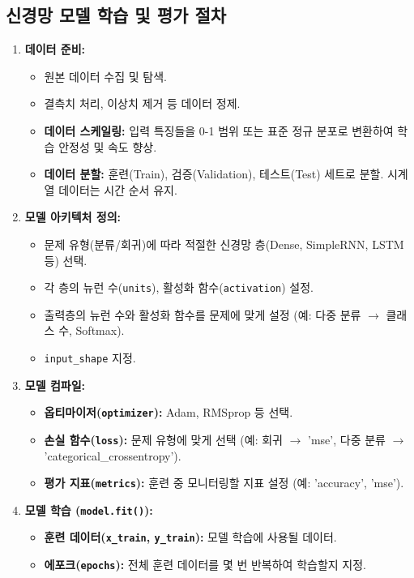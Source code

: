 \documentclass[11pt,a4paper]{article}
\theoremstyle{definition}
\begin{document}
\subsection{신경망 모델 학습 및 평가 절차}
\begin{enumerate}
    \item \textbf{데이터 준비:}
    \begin{itemize}
        \item 원본 데이터 수집 및 탐색.
        \item 결측치 처리, 이상치 제거 등 데이터 정제.
        \item \textbf{데이터 스케일링:} 입력 특징들을 0-1 범위 또는 표준 정규 분포로 변환하여 학습 안정성 및 속도 향상.
        \item \textbf{데이터 분할:} 훈련(Train), 검증(Validation), 테스트(Test) 세트로 분할. 시계열 데이터는 시간 순서 유지.
    \end{itemize}
    \item \textbf{모델 아키텍처 정의:}
    \begin{itemize}
        \item 문제 유형(분류/회귀)에 따라 적절한 신경망 층(Dense, SimpleRNN, LSTM 등) 선택.
        \item 각 층의 뉴런 수(\texttt{units}), 활성화 함수(\texttt{activation}) 설정.
        \item 출력층의 뉴런 수와 활성화 함수를 문제에 맞게 설정 (예: 다중 분류 $\rightarrow$ 클래스 수, Softmax).
        \item \texttt{input_shape} 지정.
    \end{itemize}
    \item \textbf{모델 컴파일:}
    \begin{itemize}
        \item \textbf{옵티마이저(\texttt{optimizer}):} Adam, RMSprop 등 선택.
        \item \textbf{손실 함수(\texttt{loss}):} 문제 유형에 맞게 선택 (예: 회귀 $\rightarrow$ 'mse', 다중 분류 $\rightarrow$ 'categorical_crossentropy').
        \item \textbf{평가 지표(\texttt{metrics}):} 훈련 중 모니터링할 지표 설정 (예: 'accuracy', 'mse').
    \end{itemize}
    \item \textbf{모델 학습 (\texttt{model.fit()}):}
    \begin{itemize}
        \item \textbf{훈련 데이터(\texttt{x_train}, \texttt{y_train}):} 모델 학습에 사용될 데이터.
        \item \textbf{에포크(\texttt{epochs}):} 전체 훈련 데이터를 몇 번 반복하여 학습할지 지정.

\end{itemize}
\end{enumerate}
\end{document}
